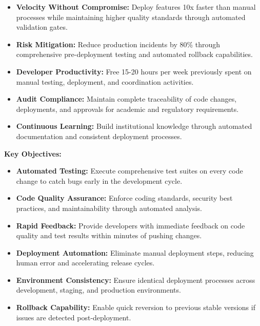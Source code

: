 \documentclass[12pt,a4paper]{article}
\begin{document}
\begin{itemize}[leftmargin=2em, itemsep=6pt]
    \item \textbf{Velocity Without Compromise:} Deploy features 10x faster than manual processes while maintaining higher quality standards through automated validation gates.
    \item \textbf{Risk Mitigation:} Reduce production incidents by 80\% through comprehensive pre-deployment testing and automated rollback capabilities.
    \item \textbf{Developer Productivity:} Free 15-20 hours per week previously spent on manual testing, deployment, and coordination activities.
    \item \textbf{Audit Compliance:} Maintain complete traceability of code changes, deployments, and approvals for academic and regulatory requirements.
    \item \textbf{Continuous Learning:} Build institutional knowledge through automated documentation and consistent deployment processes.
\end{itemize}

\begin{tcolorbox}[colback=primaryblue!5, colframe=primaryblue, boxrule=1pt, arc=3pt, left=10pt, right=10pt, top=8pt, bottom=8pt]

\textbf{Key Objectives:}

\begin{itemize}[leftmargin=2em, itemsep=6pt]
    \item \textbf{Automated Testing:} Execute comprehensive test suites on every code change to catch bugs early in the development cycle.
    \item \textbf{Code Quality Assurance:} Enforce coding standards, security best practices, and maintainability through automated analysis.
    \item \textbf{Rapid Feedback:} Provide developers with immediate feedback on code quality and test results within minutes of pushing changes.
    \item \textbf{Deployment Automation:} Eliminate manual deployment steps, reducing human error and accelerating release cycles.
    \item \textbf{Environment Consistency:} Ensure identical deployment processes across development, staging, and production environments.
    \item \textbf{Rollback Capability:} Enable quick reversion to previous stable versions if issues are detected post-deployment.
\end{itemize}

\end{tcolorbox}
\end{document}
